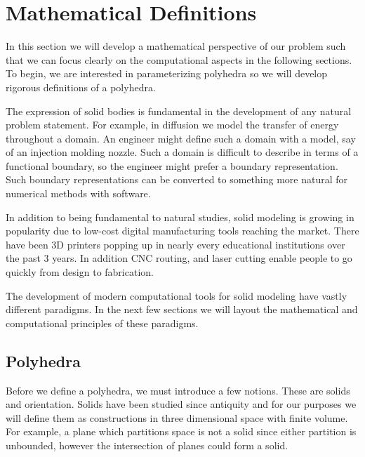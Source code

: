 
\chapter{Mathematical Definitions}

In this section we will develop a mathematical perspective of our problem
such that we can focus clearly on the computational aspects in the following
sections. To begin, we are interested in parameterizing polyhedra so we will
develop rigorous definitions of a polyhedra.

The expression of solid bodies is fundamental in the development of any
natural problem statement. For example, in diffusion we model the transfer of
energy throughout a domain. An engineer might define such a domain with a
model, say of an injection molding nozzle. Such a domain is difficult to
describe in terms of a functional boundary, so the engineer might prefer
a boundary representation. Such boundary representations can be converted
to something more natural for numerical methods with software.

In addition to being fundamental to natural studies, solid modeling is growing
in popularity due to low-cost digital manufacturing tools reaching the market.
There have been 3D printers popping up in nearly every educational
institutions over the past 3 years. In addition CNC routing, and laser cutting
enable people to go quickly from design to fabrication.

The development of modern
computational tools for solid modeling have vastly different paradigms. In
the next few sections we will layout the mathematical and computational
principles of these paradigms.

\section{Polyhedra}

Before we define a polyhedra, we must introduce a few notions. These are
solids and orientation. Solids have been studied since
antiquity and for our purposes we will define them as constructions in
three dimensional space with finite volume.
For example, a plane which partitions space is not a solid
since either partition is unbounded, however the intersection of planes
could form a solid.

